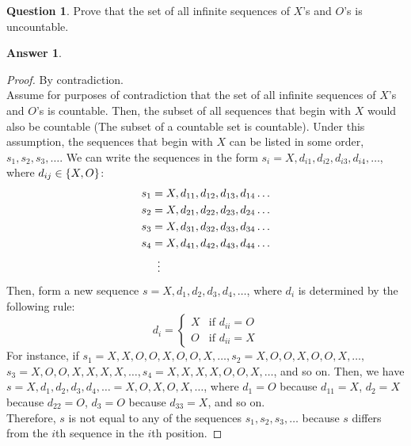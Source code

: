 \documentclass[article, 12pt]{article}
\theoremstyle{definition}
\newtheorem{question}{Question}
\newtheorem{answer}{Answer}
\DeclarePairedDelimiter\set{\{}{\}}
\begin{document}
    \begin{question}
        Prove that the set of all infinite sequences of $X$'s and $O$'s is uncountable.
    \end{question}
    
    \begin{answer}
        
        \begin{proof} By contradiction. 
            \\[12pt]
            Assume for purposes of contradiction that the set of all infinite sequences of $X$'s and $O$'s is countable. Then, the subset of all sequences that begin with $X$ would also be countable (The subset of a countable set is countable). Under this assumption, the sequences that begin with $X$ can be listed in some order, $s_1, s_2, s_3, \dots$. We can write the sequences in the form $s_i = X, d_{i1}, d_{i2}, d_{i3}, d_{i4}, \dots$, where $d_{ij} \in \set*{X,O}$:
            \begin{align*}
                s_1 &= X,d_{11},d_{12},d_{13},d_{14}\dots \\
                s_2 &= X,d_{21},d_{22},d_{23},d_{24}\dots \\
                s_3 &= X,d_{31},d_{32},d_{33},d_{34}\dots \\
                s_4 &= X,d_{41},d_{42},d_{43},d_{44}\dots \\
                    &\vdotswithin{=}
            \end{align*}
            Then, form a new sequence $s = X, d_1, d_2, d_3, d_4, \dots$, where $d_i$ is determined by the following rule:
            \begin{equation*}
                d_i = \begin{cases}
                    X & \text{if } d_{ii} = O \\
                    O & \text{if } d_{ii} = X
                \end{cases}
            \end{equation*}
            For instance, if $s_1 = X, X, O, O, X, O, O, X, \dots, s_2 = X, O, O, X, O, O, X, \dots,$ \\ $s_3 = X, O, O, X, X, X, X, \dots, s_4 = X, X, X, X, O, O, X, \dots$, and so on. Then, we have $s = X, d_1, d_2, d_3, d_4, \dots = X, O, X, O, X, \dots$, where $d_1 = O$ because $d_{11} = X$, $d_2 = X$ because $d_{22} = O$, $d_3 = O$ because $d_{33} = X$, and so on. 
            \\[12pt]
            Therefore, $s$ is not equal to any of the sequences $s_1, s_2, s_3, \dots$ because $s$ differs from the $i$th sequence in the $i$th position. 

\end{proof}
\end{answer}
\end{document}

